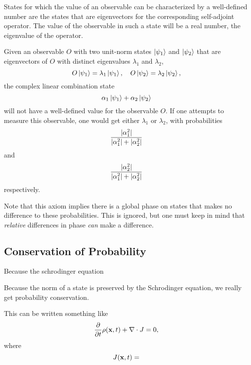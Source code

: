 \documentclass[a4paper]{scrartcl}
\begin{document}
\begin{axiom}[Measurement]
    States for which the value of an observable can be characterized by a well-defined number are the states that are eigenvectors for the corresponding self-adjoint operator. The value of the observable in such a state will be a real number, the eigenvalue of the operator.
\end{axiom}

\begin{axiom}
    Given an observable $O$ with two unit-norm states $\ket{\psi_1}$ and $\ket{\psi_2}$ that are eigenvectors of $O$ with distinct eigenvalues $\lambda_1$ and $\lambda_2$,
    $$
    O \ket{\psi_1} = \lambda_1 \ket{\psi_1}, \quad O\ket{\psi_2} = \lambda_2 \ket{\psi_2},
    $$
    the complex linear combination state 
    $$
    \alpha_1 \ket{\psi_1} + \alpha_2 \ket{\psi_2}
    $$
    will not have a well-defined value for the observable $O$. If one attempts to measure this observable, one would get either $\lambda_1$ or $\lambda_2$, with probabilities
    $$
    \frac{\lvert\alpha_1^2\rvert}{\lvert\alpha_1^2\rvert + \lvert\alpha_2^2\rvert}
    $$
    and
    $$
    \frac{\lvert\alpha_2^2\rvert}{\lvert\alpha_1^2\rvert + \lvert\alpha_2^2\rvert}
    $$
    respectively.
\end{axiom}

Note that this axiom implies there is a global phase on states that makes no difference to these probabilities. This is ignored, but one must keep in mind that \emph{relative} differences in phase \emph{can} make a difference.

\subsection{Conservation of Probability}

Because the schrodinger equation

Because the norm of a state is preserved by the Schrodinger equation, we really get probability conservation.

This can be written something like
$$
\frac{\partial}{\partial t} \rho(\mathbf{x}, t) + \nabla \cdot J = 0,
$$
where
$$
J(\mathbf{x}, t) = 
$$
\end{document}
